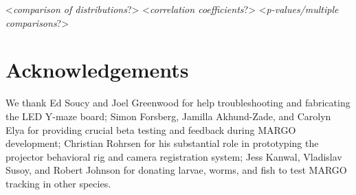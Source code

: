 \documentclass[10pt]{article}
\begin{document}
\begin{multicols}{2}
<\textit{comparison of distributions}?>
<\textit{correlation coefficients}?>
<\textit{p-values/multiple comparisons}?>

\section*{Acknowledgements}

We thank Ed Soucy and Joel Greenwood for help troubleshooting and fabricating the LED Y-maze board; Simon Forsberg, Jamilla Akhund-Zade, and Carolyn Elya for providing crucial beta testing and feedback during MARGO development; Christian Rohrsen for his substantial role in prototyping the projector behavioral rig and camera registration system; Jess Kanwal, Vladislav Susoy, and Robert Johnson for donating larvae, worms, and fish to test MARGO tracking in other species.

 
\end{multicols}
\end{document}
